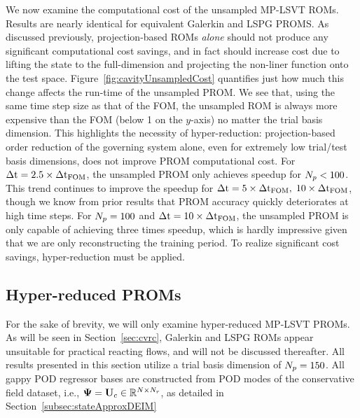 We now examine the computational cost of the unsampled MP-LSVT ROMs. Results are nearly identical for equivalent Galerkin and LSPG PROMS. As discussed previously, projection-based ROMs \textit{alone} should not produce any significant computational cost savings, and in fact should increase cost due to lifting the state to the full-dimension and projecting the non-liner function onto the test space. Figure~\ref{fig:cavityUnsampledCost} quantifies just how much this change affects the run-time of the unsampled PROM. We see that, using the same time step size as that of the FOM, the unsampled ROM is always more expensive than the FOM (below 1 on the $y$-axis) no matter the trial basis dimension. This highlights the necessity of hyper-reduction: projection-based order reduction of the governing system alone, even for extremely low trial/test basis dimensions, does not improve PROM computational cost. For $\Delta \text{t} = 2.5 \times \Delta \text{t}_{\text{FOM}}$, the unsampled PROM only achieves speedup for $N_p < 100$. This trend continues to improve the speedup for $\Delta \text{t} = 5 \times \Delta \text{t}_{\text{FOM}}, \; 10 \times \Delta \text{t}_{\text{FOM}}$, though we know from prior results that PROM accuracy quickly deteriorates at high time steps. For $N_p = 100$ and $\Delta \text{t} = 10 \times \Delta \text{t}_{\text{FOM}}$, the unsampled PROM is only capable of achieving three times speedup, which is hardly impressive given that we are only reconstructing the training period. To realize significant cost savings, hyper-reduction must be applied.

\subsection{Hyper-reduced PROMs}
%
For the sake of brevity, we will only examine hyper-reduced MP-LSVT PROMs. As will be seen in Section~\ref{sec:cvrc}, Galerkin and LSPG ROMs appear unsuitable for practical reacting flows, and will not be discussed thereafter. All results presented in this section utilize a trial basis dimension of $N_p = 150$. All gappy POD regressor bases are constructed from POD modes of the conservative field dataset, i.e., $\deimBasis = \consTrial \inRTwo{\numDOF}{\numResModes}$, as detailed in Section~\ref{subsec:stateApproxDEIM}

